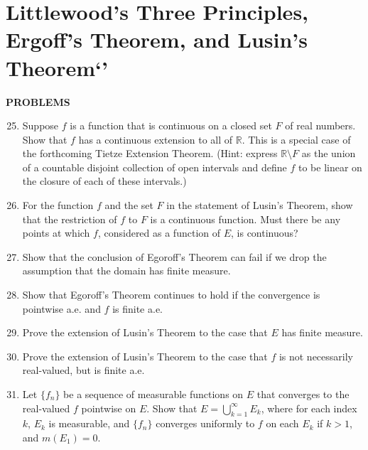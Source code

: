 \section{Littlewood's Three Principles, Ergoff's Theorem, and Lusin's Theorem`'}
\begin{center}
	\textbf{PROBLEMS}
\end{center}
\begin{enumerate}
	\setcounter{enumi}{24}
    \item Suppose $f$ is a function that is continuous on a closed set $F$ of real numbers. Show that $f$ has a continuous extension to all of $\mathbb{R}$. This is a special case of the forthcoming Tietze Extension Theorem.
    (Hint: express $\mathbb{R}\setminus F$ as the union of a countable disjoint collection of open intervals and define $f$ to be linear on the closure of each of these intervals.)
    \item For the function $f$ and the set $F$ in the statement of Lusin's Theorem, show that the restriction of $f$ to $F$ is a continuous function.
    Must there be any points at which $f$, considered as a function of $E$, is continuous?
    \item Show that the conclusion of Egoroff's Theorem can fail if we drop the assumption that the domain has finite measure.
    \item Show that Egoroff's Theorem continues to hold if the convergence is pointwise a.e. and $f$ is finite a.e.
    \item Prove the extension of Lusin's Theorem to the case that $E$ has finite measure.
    \item Prove the extension of Lusin's Theorem to the case that $f$ is not necessarily real-valued, but is finite a.e.
    \item Let $\{f_n\}$ be a sequence of measurable functions on $E$ that converges to the real-valued $f$ pointwise on $E$. Show that $E=\bigcup_{k=1}^\infty E_k$, where for each index $k$, $E_k$ is measurable, and $\{f_n\}$ converges uniformly to $f$ on each $E_k$ if $k>1$, and $m(E_1)=0$.  
\end{enumerate}